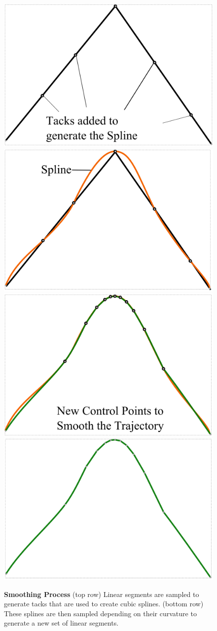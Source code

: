 \begin{figure}[t]
	\begin{center}
	\includegraphics[width=0.48\linewidth]{./images/Smooth1.png}
	\includegraphics[width=0.48\linewidth]{./images/Smooth2.png}\\
	\includegraphics[width=0.48\linewidth]{./images/Smooth3.png}
	\includegraphics[width=0.48\linewidth]{./images/Smooth4.png}
	\caption{
		\textbf{Smoothing Process}
		(top row) Linear segments are sampled to generate tacks that are used to create cubic splines.
		(bottom row) These splines are then sampled depending on their curvature to generate a new set of linear segments.
	}
	\label{fig:smoothing}
	\end{center}
\end{figure}

